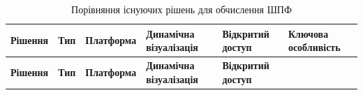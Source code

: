 \documentclass[
]{article}
\begin{document}
\begin{longtable}[]{@{}
  >{\centering\arraybackslash}p{}
  >{\centering\arraybackslash}p{}
  >{\centering\arraybackslash}p{}
  >{\centering\arraybackslash}p{}
  >{\centering\arraybackslash}p{}
  >{\centering\arraybackslash}p{}@{}}
\caption[Порівняння існуючих рішень для обчислення ШПФ]{Порівняння
існуючих рішень для обчислення ШПФ}\tabularnewline
\toprule\noalign{}
\begin{minipage}[b]{\linewidth}\centering
\textbf{Рішення}
\end{minipage} & \begin{minipage}[b]{\linewidth}\centering
\textbf{Тип}
\end{minipage} & \begin{minipage}[b]{\linewidth}\centering
\textbf{Платформа}
\end{minipage} & \begin{minipage}[b]{\linewidth}\centering
\textbf{Динамічна візуалізація}
\end{minipage} & \begin{minipage}[b]{\linewidth}\centering
\textbf{Відкритий доступ}
\end{minipage} & \begin{minipage}[b]{\linewidth}\centering
\textbf{Ключова особливість}
\end{minipage} \\
\midrule\noalign{}
\endfirsthead
\toprule\noalign{}
\begin{minipage}[b]{\linewidth}\centering
\textbf{Рішення}
\end{minipage} & \begin{minipage}[b]{\linewidth}\centering
\textbf{Тип}
\end{minipage} & \begin{minipage}[b]{\linewidth}\centering
\textbf{Платформа}
\end{minipage} & \begin{minipage}[b]{\linewidth}\centering
\textbf{Динамічна візуалізація}
\end{minipage} & \begin{minipage}[b]{\linewidth}\centering
\textbf{Відкритий доступ}
\end{minipage} & \begin{minipage}[b]{\linewidth}\centering

\end{minipage}
\end{longtable}
\end{document}
